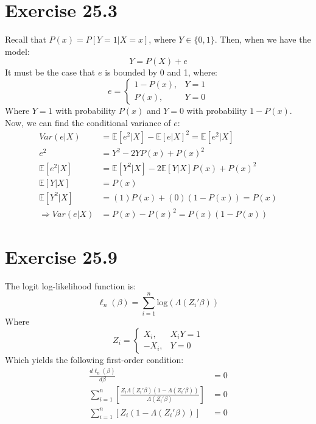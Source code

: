 \documentclass{article}
\newcommand{\sumn}{\sum_{i=1}^{n}}
\newcommand{\loge}[1]{\text{log}\left(#1\right)}
\newcommand{\E}[1]{\mathbb{E}\left[#1\right]}%
\begin{document}
\section*{Exercise 25.3}
Recall that ${P(x)=P[Y=1|X=x]}$, where ${Y\in\{0,1\}}$. Then, when we have the model:
\[
	Y = P(X) + e
\]
It must be the case that $e$ is bounded by 0 and 1, where:
\[
	e =	\begin{cases}
			1-P(x),	&Y = 1	\\
			P(x),	&Y = 0
		\end{cases}
\]
Where $Y=1$ with probability $P(x)$ and ${Y=0}$ with probability ${1-P(x)}$. Now, we can find the conditional variance of $e$:
\begin{align*}
				Var(e|X)	&= \E{e^2|X} - \E{e|X}^2 = \E{e^2|X}		\\
				e^2 		&= Y^2 - 2YP(x) + P(x)^2					\\
				\E{e^2|X}	&= \E{Y^2|X} - 2\E{Y|X}P(x) + P(x)^2		\\
				\E{Y|X}		&= P(x)										\\
				\E{Y^2|X}	&= (1)P(x) + (0)(1-P(x)) = P(x)				\\
	\Rightarrow Var(e|X)	&= P(x) - P(x)^2 = P(x)\left(1-P(x)\right)
\end{align*}


\section*{Exercise 25.9}
The logit log-likelihood function is:
\[
	\ell_n(\beta) = \sumn\loge{\Lambda\left(Z_i'\beta\right)}
\]
Where $$ Z_i = \begin{cases} X_i, &X_i Y = 1 \\ -X_i, &Y=0\end{cases} $$ Which yields the following first-order condition:
\begin{align*}
																		\frac{d\ell_n(\beta)}{d\beta}	&= 0	\\
	\sumn\left[\frac{Z_i\Lambda(Z_i'\beta)\left(1-\Lambda(Z_i'\beta)\right)}{\Lambda(Z_i'\beta)}\right]	&= 0	\\
												\sumn\left[Z_i\left(1-\Lambda(Z_i'\beta)\right)\right]	&= 0	
\end{align*}

\end{document}
